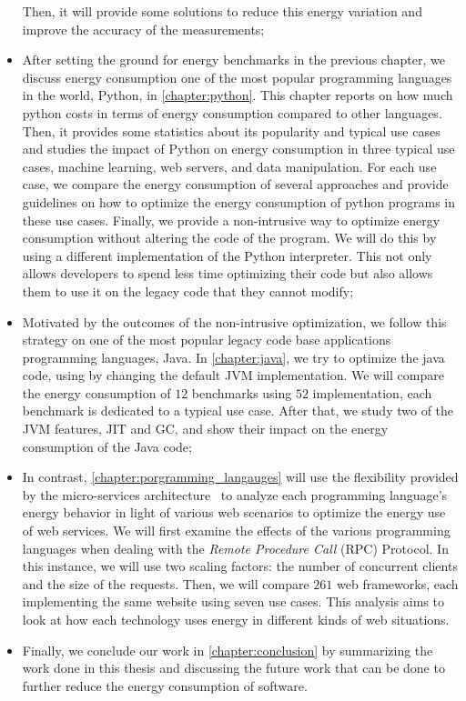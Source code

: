 \begin{itemize}
    Then, it will provide some solutions to reduce this energy variation and improve the accuracy of the measurements;
    \item After setting the ground for energy benchmarks in the previous chapter, we discuss energy consumption one of the most popular programming languages in the world, Python, in \cref{chapter:python}.
    This chapter reports on how much python costs in terms of energy consumption compared to other languages.
    Then, it provides some statistics about its popularity and typical use cases and studies the impact of Python on energy consumption in three typical use cases, machine learning, web servers, and data manipulation.
    For each use case, we compare the energy consumption of several approaches and provide guidelines on how to optimize the energy consumption of python programs in these use cases.
    Finally, we provide a non-intrusive way to optimize energy consumption without altering the code of the program.
    We will do this by using a different implementation of the Python interpreter.
    This not only allows developers to spend less time optimizing their code but also allows them to use it on the legacy code that they cannot modify;
    \item Motivated by the outcomes of the non-intrusive optimization, we follow this strategy on one of the most popular legacy code base applications programming languages, Java.
    In \cref{chapter:java}, we try to optimize the java code, using by changing the default JVM implementation.
    We will compare the energy consumption of $12$ benchmarks using $52$ implementation, each benchmark is dedicated to a typical use case.
    After that, we study two of the JVM features, JIT and GC, and show their impact on the energy consumption of the Java code;
    \item In contrast, \cref{chapter:porgramming_langauges} will use the flexibility provided by the micro-services architecture~\cite{dmitry2014micro} to analyze each programming language's energy behavior in light of various web scenarios to optimize the energy use of web services.
    We will first examine the effects of the various programming languages when dealing with the \emph{Remote Procedure Call} (RPC) Protocol.
    In this instance, we will use two scaling factors: the number of concurrent clients and the size of the requests. Then, we will compare $261$ web frameworks, each implementing the same website using seven use cases.
    This analysis aims to look at how each technology uses energy in different kinds of web situations.
    \item Finally, we conclude our work in \cref{chapter:conclusion} by summarizing the work done in this thesis and discussing the future work that can be done to further reduce the energy consumption of software.
\end{itemize}

